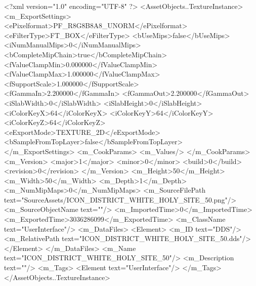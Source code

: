 <?xml version="1.0" encoding="UTF-8" ?>
<AssetObjects..TextureInstance>
	<m_ExportSettings>
		<ePixelformat>PF_R8G8B8A8_UNORM</ePixelformat>
		<eFilterType>FT_BOX</eFilterType>
		<bUseMips>false</bUseMips>
		<iNumManualMips>0</iNumManualMips>
		<bCompleteMipChain>true</bCompleteMipChain>
		<fValueClampMin>0.000000</fValueClampMin>
		<fValueClampMax>1.000000</fValueClampMax>
		<fSupportScale>1.000000</fSupportScale>
		<fGammaIn>2.200000</fGammaIn>
		<fGammaOut>2.200000</fGammaOut>
		<iSlabWidth>0</iSlabWidth>
		<iSlabHeight>0</iSlabHeight>
		<iColorKeyX>64</iColorKeyX>
		<iColorKeyY>64</iColorKeyY>
		<iColorKeyZ>64</iColorKeyZ>
		<eExportMode>TEXTURE_2D</eExportMode>
		<bSampleFromTopLayer>false</bSampleFromTopLayer>
	</m_ExportSettings>
	<m_CookParams>
		<m_Values/>
	</m_CookParams>
	<m_Version>
		<major>1</major>
		<minor>0</minor>
		<build>0</build>
		<revision>0</revision>
	</m_Version>
	<m_Height>50</m_Height>
	<m_Width>50</m_Width>
	<m_Depth>1</m_Depth>
	<m_NumMipMaps>0</m_NumMipMaps>
	<m_SourceFilePath text="SourceAssets/ICON_DISTRICT_WHITE_HOLY_SITE_50.png"/>
	<m_SourceObjectName text=""/>
	<m_ImportedTime>0</m_ImportedTime>
	<m_ExportedTime>3036286099</m_ExportedTime>
	<m_ClassName text="UserInterface"/>
	<m_DataFiles>
		<Element>
			<m_ID text="DDS"/>
			<m_RelativePath text="ICON_DISTRICT_WHITE_HOLY_SITE_50.dds"/>
		</Element>
	</m_DataFiles>
	<m_Name text="ICON_DISTRICT_WHITE_HOLY_SITE_50"/>
	<m_Description text=""/>
	<m_Tags>
		<Element text="UserInterface"/>
	</m_Tags>
</AssetObjects..TextureInstance>

